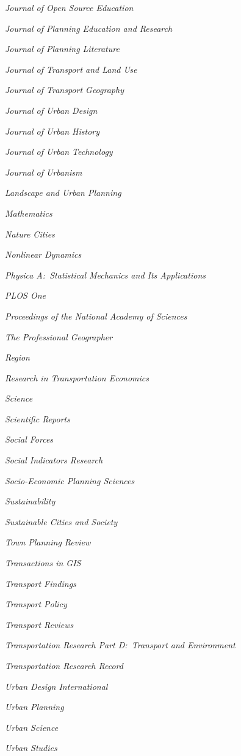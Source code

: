 \documentclass[11pt,letterpaper]{report} %
\newcommand{\listitemspace}{0.25em}
\renewenvironment{itemize}
{\begin{list}{}{\setlength{\leftmargin}{0em}
                \setlength{\parskip}{0em}
                \setlength{\itemsep}{\listitemspace}
                \setlength{\parsep}{\listitemspace}}}
{\end{list}}
\begin{document}
\begin{itemize}
        \item \textit{Journal of Open Source Education}
        \item \textit{Journal of Planning Education and Research}
        \item \textit{Journal of Planning Literature}
        \item \textit{Journal of Transport and Land Use}
        \item \textit{Journal of Transport Geography}
        \item \textit{Journal of Urban Design}
        \item \textit{Journal of Urban History}
        \item \textit{Journal of Urban Technology}
        \item \textit{Journal of Urbanism}
        \item \textit{Landscape and Urban Planning}
        \item \textit{Mathematics}
        \item \textit{Nature Cities}
        \item \textit{Nonlinear Dynamics}
        \item \textit{Physica A:\ Statistical Mechanics and Its Applications}
        \item \textit{PLOS One}
        \item \textit{Proceedings of the National Academy of Sciences}
        \item \textit{The Professional Geographer}
        \item \textit{Region}
        \item \textit{Research in Transportation Economics}
        \item \textit{Science}
        \item \textit{Scientific Reports}
        \item \textit{Social Forces}
        \item \textit{Social Indicators Research}
        \item \textit{Socio-Economic Planning Sciences}
        \item \textit{Sustainability}
        \item \textit{Sustainable Cities and Society}
        \item \textit{Town Planning Review}
        \item \textit{Transactions in GIS}
        \item \textit{Transport Findings}
        \item \textit{Transport Policy}
        \item \textit{Transport Reviews}
        \item \textit{Transportation Research Part D:\ Transport and Environment}
        \item \textit{Transportation Research Record}
        \item \textit{Urban Design International}
        \item \textit{Urban Planning}
        \item \textit{Urban Science}
        \item \textit{Urban Studies}


\end{itemize}
\end{document}
